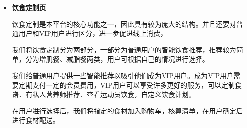 \documentclass[UTF8,12pt]{ctexart}
\numberwithin{figure}{section}%
\begin{document}
\begin{spacing}{2}
\begin{itemize}
	
	\newpage
	
	\item\textbf{饮食定制页}
	
	
	饮食定制是本平台的核心功能之一，因此具有较为庞大的结构。并且还要对普通用户和VIP用户进行区分，进一步促进线上消费，
	
	我们将饮食定制分为两部分，一部分为普通用户的智能饮食推荐，推荐较为简单，分为增肌餐、减脂餐两类，用户可根据自己的情况进行选择。
	
	我们给普通用户提供一些智能推荐以吸引他们成为VIP用户。成为VIP用户需要定期支付一定的会员费用，VIP用户可以享受许多更好的服务，可以定制食谱、有私人营养师推荐、查看运动员饮食，自定义饮食计划。
	
	在用户进行选择后，我们将指定的食材加入购物车，核算清单，在用户确定后进行食材配送。
	
	\newpage
	

\end{itemize}
\end{spacing}
\end{document}
